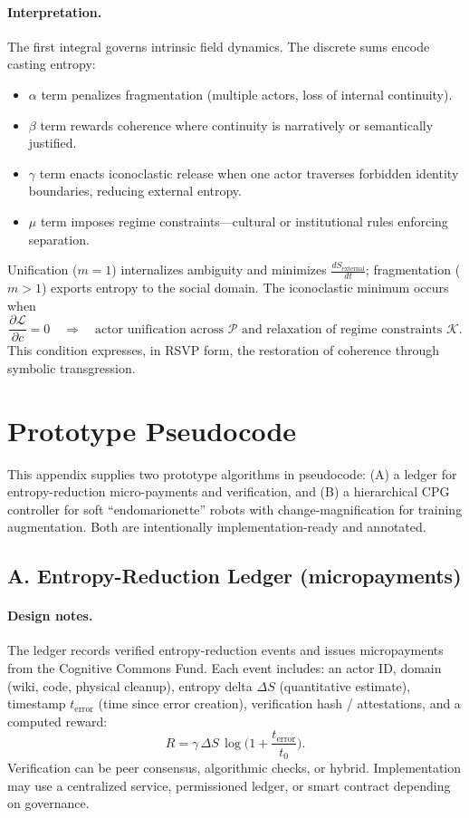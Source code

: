 \documentclass[12pt]{article}
\begin{document}
\paragraph{Interpretation.}
The first integral governs intrinsic field dynamics.  
The discrete sums encode casting entropy:
\begin{itemize}[leftmargin=1.5em]
\item $\alpha$ term penalizes fragmentation (multiple actors, loss of internal continuity).
\item $\beta$ term rewards coherence where continuity is narratively or semantically justified.
\item $\gamma$ term enacts iconoclastic release when one actor traverses forbidden identity boundaries, reducing external entropy.
\item $\mu$ term imposes regime constraints—cultural or institutional rules enforcing separation.
\end{itemize}
Unification ($m=1$) internalizes ambiguity and minimizes $\frac{dS_{\text{external}}}{dt}$;  
fragmentation ($m>1$) exports entropy to the social domain.  
The iconoclastic minimum occurs when
\[
\frac{\partial \mathcal L}{\partial c} = 0 \quad \Rightarrow \quad
\text{actor unification across } \mathcal P \text{ and relaxation of regime constraints } \mathcal K.
\]
This condition expresses, in RSVP form, the restoration of coherence through symbolic transgression.

\section{Prototype Pseudocode}
\label{appendix:pseudocode}

This appendix supplies two prototype algorithms in pseudocode: (A) a ledger for entropy-reduction micro-payments and verification, and (B) a hierarchical CPG controller for soft ``endomarionette'' robots with change-magnification for training augmentation. Both are intentionally implementation-ready and annotated.

\subsection{A. Entropy-Reduction Ledger (micropayments)}
\paragraph{Design notes.}
The ledger records verified entropy-reduction events and issues micropayments from the Cognitive Commons Fund. Each event includes: an actor ID, domain (wiki, code, physical cleanup), entropy delta \(\Delta S\) (quantitative estimate), timestamp \(t_{\mathrm{error}}\) (time since error creation), verification hash / attestations, and a computed reward:
\[
R = \gamma \,\Delta S \, \log\!\Big(1 + \frac{t_{\mathrm{error}}}{t_0}\Big).
\]
Verification can be peer consensus, algorithmic checks, or hybrid. Implementation may use a centralized service, permissioned ledger, or smart contract depending on governance.
\end{document}
